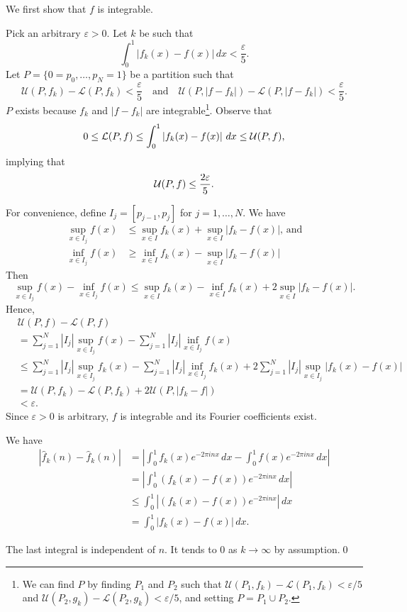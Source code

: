 \documentclass[oneside]{article}
\newcommand\abs[1]{\left|#1\right|}
\newcommand\calU{\mathcal{U}}
\newcommand\calL{\mathcal{L}}
\begin{document}
  We first show that $f$ is integrable.

  Pick an arbitrary $\varepsilon > 0$. Let $k$ be such that \[
    \int_0^1\abs{f_k(x)-f(x)}\,dx < \frac\varepsilon5 \text{.}
  \] Let $P = \{0 = p_0, \dots, p_N=1\}$ be a partition such that\[
    \calU(P, f_k) - \calL(P, f_k) < \frac\varepsilon5
    \quad\text{and}\quad
    \calU(P, \abs{f-f_k}) - \calL(P, \abs{f-f_k}) < \frac\varepsilon5 \text{.}
  \] $P$ exists because $f_k$ and $\abs{f-f_k}$ are integrable\footnote{
    We can find $P$ by finding $P_1$ and $P_2$ such that
    $\calU(P_1, f_k) - \calL(P_1, f_k) < \varepsilon/5$ and
    $\calU(P_2, g_k) - \calL(P_2, g_k) < \varepsilon/5$, and setting
    $P = P_1 \cup P_2$.
  }. Observe that \[
    0 \leq \calL(P, f) \leq \int_0^1 \abs{f_k(x) - f(x)}\,dx
    \leq \calU(P, f)\text,
  \] implying that \[
    \calU(P, f) \leq \frac{2\varepsilon}{5}\text.
  \]

  For convenience, define $I_j = [p_{j-1}, p_j]$ for $j = 1, \dots, N$. We have
  \begin{align*}
    \sup_{x\in I_j} f(x) &\leq \sup_{x\in I} f_k(x)
    + \sup_{x\in I} \abs{f_k - f(x)}
    \text{, and} \\
    \inf_{x\in I_j} f(x) &\geq \inf_{x\in I} f_k(x)
    - \sup_{x\in I} \abs{f_k - f(x)}
  \end{align*} Then \[
    \sup_{x\in I_j}f(x) - \inf_{x\in I_j} f(x)
    \leq \sup_{x\in I} f_k(x) - \inf_{x\in I} f_k(x)
    + 2\sup_{x\in I} \abs{f_k - f(x)} \text{.}
  \] Hence,\begin{align*}
    &\calU(P, f) - \calL(P, f) \\
    &= \sum_{j=1}^N \abs{I_j}\sup_{x\in I_j}f(x)
    - \sum_{j=1}^N \abs{I_j}\inf_{x\in I_j}f(x) \\
    &\leq \sum_{j=1}^N \abs{I_j}\sup_{x\in I_j}f_k(x)
    - \sum_{j=1}^N \abs{I_j}\inf_{x\in I_j}f_k(x)
    + 2\sum_{j=1}^N \abs{I_j}\sup_{x\in I_j}\abs{f_k(x) - f(x)} \\
    &= \calU(P, f_k) - \calL(P, f_k) + 2\calU(P, \abs{f_k - f}) \\
    &< \varepsilon \text{.}
  \end{align*} Since $\varepsilon > 0$ is arbitrary, $f$ is integrable and its
  Fourier coefficients exist.

  We have\begin{align*}
    \abs{\hat{f}_k(n) - \hat{f}_k(n)}
    &= \abs{\int_0^1f_k(x)e^{-2\pi inx}\,dx - \int_0^1f(x)e^{-2\pi inx}\,dx} \\
    &= \abs{\int_0^1\left(f_k(x) - f(x)\right)e^{-2\pi inx}\,dx} \\
    &\leq \int_0^1\abs{\left(f_k(x) - f(x)\right)e^{-2\pi inx}}\,dx \\
    &= \int_0^1\abs{f_k(x) - f(x)}\,dx \text{.}
  \end{align*}

  The last integral is independent of $n$. It tends to $0$ as $k \to \infty$ by
  assumption.\qed
\end{document}

